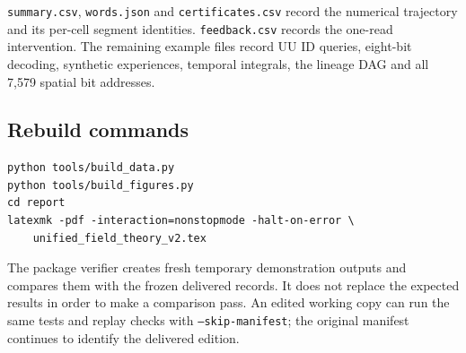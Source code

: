 \documentclass[11pt,a4paper]{article}
\numberwithin{equation}{section}
\begin{document}
\texttt{summary.csv}, \texttt{words.json} and \texttt{certificates.csv} record the numerical trajectory and its per-cell segment identities. \texttt{feedback.csv} records the one-read intervention. The remaining example files record UU ID queries, eight-bit decoding, synthetic experiences, temporal integrals, the lineage DAG and all 7,579 spatial bit addresses.

\subsection*{Rebuild commands}
\begin{lstlisting}
python tools/build_data.py
python tools/build_figures.py
cd report
latexmk -pdf -interaction=nonstopmode -halt-on-error \
    unified_field_theory_v2.tex
\end{lstlisting}
The package verifier creates fresh temporary demonstration outputs and compares them with the frozen delivered records. It does not replace the expected results in order to make a comparison pass. An edited working copy can run the same tests and replay checks with \texttt{--skip-manifest}; the original manifest continues to identify the delivered edition.
\end{document}
